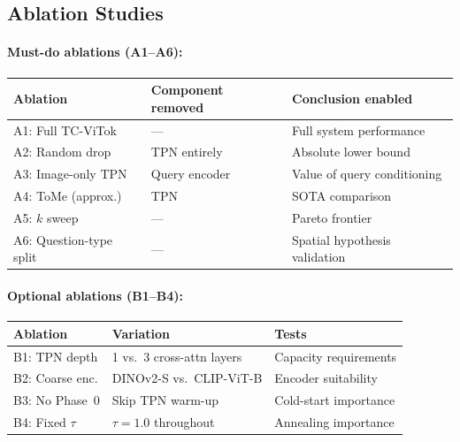 \documentclass[12pt,a4paper]{article}
\begin{document}
\subsection{Ablation Studies}

\paragraph{Must-do ablations (A1--A6):}

\begin{center}
\renewcommand{\arraystretch}{1.2}
\begin{tabular}{@{}lll@{}}
  \toprule
  Ablation & Component removed & Conclusion enabled \\
  \midrule
  A1: Full TC-ViTok   & ---           & Full system performance \\
  A2: Random drop     & TPN entirely  & Absolute lower bound \\
  A3: Image-only TPN  & Query encoder & Value of query conditioning \\
  A4: ToMe (approx.)  & TPN           & SOTA comparison \\
  A5: $k$ sweep       & ---           & Pareto frontier \\
  A6: Question-type split & ---       & Spatial hypothesis validation \\
  \bottomrule
\end{tabular}
\end{center}

\paragraph{Optional ablations (B1--B4):}

\begin{center}
\renewcommand{\arraystretch}{1.2}
\begin{tabular}{@{}lll@{}}
  \toprule
  Ablation & Variation & Tests \\
  \midrule
  B1: TPN depth   & 1 vs.\ 3 cross-attn layers  & Capacity requirements \\
  B2: Coarse enc. & DINOv2-S vs.\ CLIP-ViT-B    & Encoder suitability \\
  B3: No Phase~0  & Skip TPN warm-up            & Cold-start importance \\
  B4: Fixed $\tau$ & $\tau{=}1.0$ throughout    & Annealing importance \\
  \bottomrule
\end{tabular}
\end{center}
\end{document}
